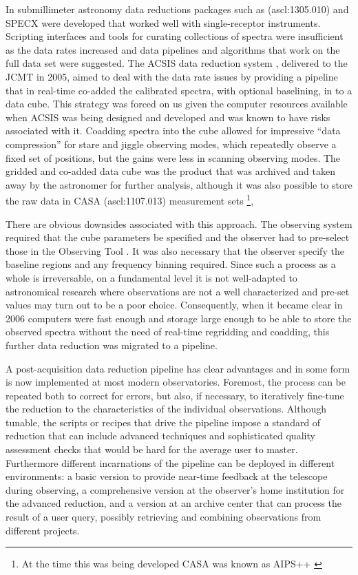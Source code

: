 \documentclass[final,authoryear,5p,times,twocolumn]{elsarticle}
\begin{document}
In submillimeter astronomy data reductions packages such as
(ascl:1305.010) and
SPECX \citep[][ascl:1310.008]{SPECX} were developed that worked well with
single-receptor instruments. Scripting interfaces and tools for
curating collections of spectra were insufficient as the data rates
increased and data pipelines \citep[e.g.,][]{1995ASPC...75..117W} and
algorithms that work on the full data set
\citep[e.g.,][]{2002ASPC..278..329M} were suggested. The ACSIS data
reduction system \citep{2000ASPC..216..502L,2000SPIE.4015..114H},
delivered to the JCMT in 2005, aimed to deal with the data rate issues
by providing a pipeline that in real-time co-added the calibrated
spectra, with optional baselining, in to a data cube.  This strategy
was forced on us given the computer resources available when ACSIS was
being designed and developed and was known to have risks associated
with it. Coadding spectra into the cube allowed for impressive ``data
compression'' for stare and jiggle observing modes, which repeatedly 
observe a fixed set of positions, but the gains were less in scanning 
observing modes.
The gridded and co-added data cube was the product that was archived 
and taken away  by the astronomer for further analysis, although it was 
also possible to store the raw data in CASA (ascl:1107.013) measurement sets
\citep{2012ASPC..461..849P}\footnote{At the time this was being
  developed CASA was known as AIPS++ \citep{2004ASPC..314..468M}},

There are obvious downsides associated with this approach. The
observing system required that the cube parameters be specified and
the observer had to pre-select those in the Observing Tool 
\citep{2002ASPC..281..453F}. It was also
necessary that the observer specify the baseline regions and any
frequency binning required. Since such a process as a whole is
irreversable, on a fundamental level it is not well-adapted to
astronomical research where observations are not a well characterized
and pre-set values may turn out to be a poor choice.  Consequently,
when it became clear in 2006 computers were fast enough and storage
large enough to be able to store the observed spectra without the need
of real-time regridding and coadding, this further data reduction was
migrated to a pipeline.

A post-acquisition data reduction pipeline has clear advantages and in
some form is now implemented at most modern observatories. Foremost,
the process can be repeated both to correct for errors, but also, if
necessary, to iteratively fine-tune the reduction to the
characteristics of the individual observations. Although tunable, the
scripts or recipes that drive the pipeline impose a standard of
reduction that can include advanced techniques and sophisticated
quality assessment checks that would be hard for the average user to
master. Furthermore different incarnations of the pipeline can be
deployed in different environments: a basic version to provide
near-time feedback at the telescope during observing, a comprehensive
version at the observer's home institution for the advanced reduction,
and a version at an archive center that can process the result of a
user query, possibly retrieving and combining observations from
different projects.
\end{document}
